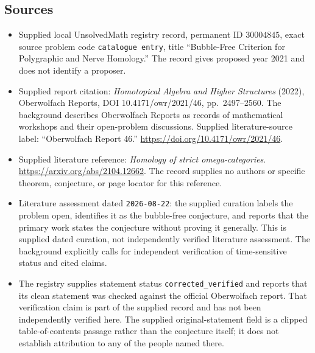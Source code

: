 \documentclass[11pt]{article}
\begin{document}
\subsection{Sources}
\begin{itemize}
\item Supplied local UnsolvedMath registry record, permanent ID \(30004845\), exact source problem code \texttt{catalogue entry}, title ``Bubble-Free Criterion for Polygraphic and Nerve Homology.'' The record gives proposed year 2021 and does not identify a proposer.
\item Supplied report citation: \emph{Homotopical Algebra and Higher Structures} (2022), Oberwolfach Reports, DOI 10.4171/owr/2021/46, pp.\ 2497--2560. The background describes Oberwolfach Reports as records of mathematical workshops and their open-problem discussions. Supplied literature-source label: ``Oberwolfach Report 46.'' \url{https://doi.org/10.4171/owr/2021/46}.
\item Supplied literature reference: \emph{Homology of strict omega-categories}. \url{https://arxiv.org/abs/2104.12662}. The record supplies no authors or specific theorem, conjecture, or page locator for this reference.
\item Literature assessment dated \texttt{2026-08-22}: the supplied curation labels the problem open, identifies it as the bubble-free conjecture, and reports that the primary work states the conjecture without proving it generally. This is supplied dated curation, not independently verified literature assessment. The background explicitly calls for independent verification of time-sensitive status and cited claims.
\item The registry supplies statement status \texttt{corrected\_verified} and reports that its clean statement was checked against the official Oberwolfach report. That verification claim is part of the supplied record and has not been independently verified here. The supplied original-statement field is a clipped table-of-contents passage rather than the conjecture itself; it does not establish attribution to any of the people named there.
\end{itemize}
\end{document}
